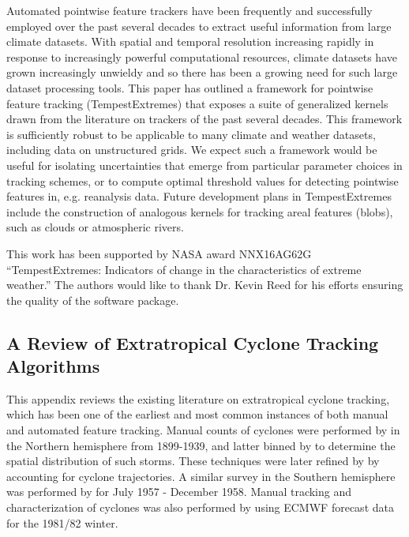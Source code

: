 \documentclass[gmdd, hvmath, online]{copernicus_discussions}
\begin{document}
\conclusions \label{sec:Conclusions}

Automated pointwise feature trackers have been frequently and successfully employed over the past several decades to extract useful information from large climate datasets.  With spatial and temporal resolution increasing rapidly in response to increasingly powerful computational resources, climate datasets have grown increasingly unwieldy and so there has been a growing need for such large dataset processing tools.  This paper has outlined a framework for pointwise feature tracking (TempestExtremes) that exposes a suite of generalized kernels drawn from the literature on trackers of the past several decades.  This framework is sufficiently robust to be applicable to many climate and weather datasets, including data on unstructured grids.  We expect such a framework would be useful for isolating uncertainties that emerge from particular parameter choices in tracking schemes, or to compute optimal threshold values for detecting pointwise features in, e.g. reanalysis data.  Future development plans in TempestExtremes include the construction of analogous kernels for tracking areal features (blobs), such as clouds or atmospheric rivers.


\pagebreak
\begin{acknowledgements}
This work has been supported by NASA award NNX16AG62G ``TempestExtremes: Indicators of change in the characteristics of extreme weather.''  The authors would like to thank Dr. Kevin Reed for his efforts ensuring the quality of the software package.
\end{acknowledgements}
\pagebreak


\appendix
\subsection{A Review of Extratropical Cyclone Tracking Algorithms} \label{sec:ExtratropicalCycloneAlgorithms}

This appendix reviews the existing literature on extratropical cyclone tracking, which has been one of the earliest and most common instances of both manual and automated feature tracking.  Manual counts of cyclones were performed by \cite{petterssen1956weather} in the Northern hemisphere from 1899-1939, and latter binned by \cite{klein1957principle} to determine the spatial distribution of such storms.  These techniques were later refined by \cite{whittaker1982atlas} by accounting for cyclone trajectories.  A similar survey in the Southern hemisphere was performed by \cite{taljaard1967development} for July 1957 - December 1958.  Manual tracking and characterization of cyclones was also performed by \cite{akyildiz1985systematic} using ECMWF forecast data for the 1981/82 winter.
\end{document}
